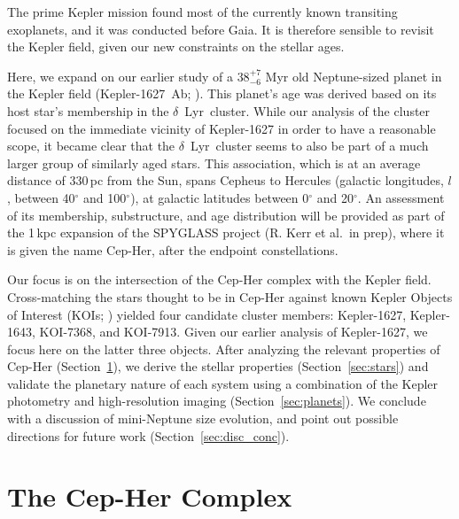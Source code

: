 \documentclass[12pt,twocolumn,tighten,linenumbers,trackchanges]{aastex63}
\begin{document}
The prime Kepler mission \citep{borucki_kepler_2010} found most of the
currently known transiting exoplanets, and it was conducted before
Gaia.  It is therefore sensible to revisit the Kepler field, given our
new constraints on the stellar ages.

Here, we expand on our earlier study of a $38^{+7}_{-6}$ Myr old
Neptune-sized planet in the Kepler field (Kepler-1627~Ab;
\citealt{bouma_kep1627_2022}).  This planet's age was derived based on
its host star's membership in the $\delta$\ Lyr\ cluster.  While our
analysis of the cluster focused on the immediate vicinity of
Kepler-1627 in order to have a reasonable scope,  it became clear that
the $\delta$\ Lyr\ cluster seems to also be part of a much larger
group of similarly aged stars.  This association, which is at an
average distance of 330\,pc from the Sun, spans Cepheus to Hercules
(galactic longitudes, $l$, between 40$^\circ$ and 100$^\circ$), at
galactic latitudes between 0$^\circ$ and 20$^\circ$.  An assessment of
its membership, substructure, and age distribution will be provided as
part of the 1\,kpc expansion of the SPYGLASS project (R. Kerr et al.\
in prep), where it is given the name Cep-Her, after the endpoint
constellations.

Our focus is on the intersection of the Cep-Her complex with the
Kepler field.  Cross-matching the stars thought to be in Cep-Her against known Kepler
Objects of Interest (KOIs; \citealt{thompson_planetary_2018}) yielded
four candidate cluster members: Kepler-1627, Kepler-1643, KOI-7368,
and KOI-7913.  Given our earlier analysis of Kepler-1627, we focus
here on the latter three objects.  After analyzing the relevant
properties of Cep-Her (Section~\ref{sec:cluster}), we derive the
stellar properties (Section~\ref{sec:stars}) and validate the
planetary nature of each system using a combination of the Kepler
photometry and high-resolution imaging (Section~\ref{sec:planets}).
We conclude with a discussion of mini-Neptune size evolution, and
point out possible directions for future work
(Section~\ref{sec:disc_conc}).

\section{The Cep-Her Complex}
\label{sec:cluster}
\end{document}
